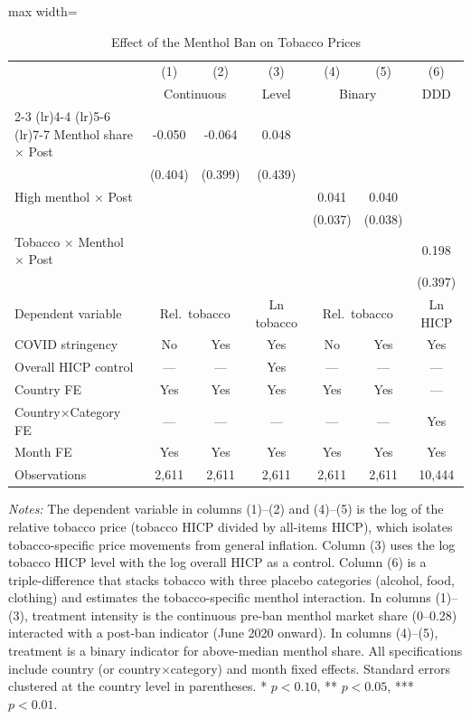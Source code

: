 \begin{table}[H]
\centering
\caption{Effect of the Menthol Ban on Tobacco Prices}
\label{tab:main}
\begin{threeparttable}
\begin{adjustbox}{max width=\textwidth}
\begin{tabular}{lcccccc}
\toprule
 & (1) & (2) & (3) & (4) & (5) & (6) \\
 & \multicolumn{2}{c}{Continuous} & Level & \multicolumn{2}{c}{Binary} & DDD \\
\cmidrule(lr){2-3} \cmidrule(lr){4-4} \cmidrule(lr){5-6} \cmidrule(lr){7-7}
\midrule
Menthol share $\times$ Post & -0.050 & -0.064 & 0.048 & & & \\
 & (0.404) & (0.399) & (0.439) & & & \\
[4pt]
High menthol $\times$ Post & & & & 0.041 & 0.040 & \\
 & & & & (0.037) & (0.038) & \\
[4pt]
Tobacco $\times$ Menthol $\times$ Post & & & & & & 0.198 \\
 & & & & & & (0.397) \\
[4pt]
\midrule
Dependent variable & \multicolumn{2}{c}{Rel.\ tobacco} & Ln tobacco & \multicolumn{2}{c}{Rel.\ tobacco} & Ln HICP \\
COVID stringency & No & Yes & Yes & No & Yes & Yes \\
Overall HICP control & --- & --- & Yes & --- & --- & --- \\
Country FE & Yes & Yes & Yes & Yes & Yes & --- \\
Country$\times$Category FE & --- & --- & --- & --- & --- & Yes \\
Month FE & Yes & Yes & Yes & Yes & Yes & Yes \\
Observations & 2,611 & 2,611 & 2,611 & 2,611 & 2,611 & 10,444 \\
\bottomrule
\end{tabular}
\end{adjustbox}
\begin{tablenotes}[flushleft]
\footnotesize \sloppy
\item \textit{Notes:} The dependent variable in columns (1)--(2) and (4)--(5) is the log of the relative tobacco price (tobacco HICP divided by all-items HICP), which isolates tobacco-specific price movements from general inflation. Column (3) uses the log tobacco HICP level with the log overall HICP as a control. Column (6) is a triple-difference that stacks tobacco with three placebo categories (alcohol, food, clothing) and estimates the tobacco-specific menthol interaction. In columns (1)--(3), treatment intensity is the continuous pre-ban menthol market share (0--0.28) interacted with a post-ban indicator (June 2020 onward). In columns (4)--(5), treatment is a binary indicator for above-median menthol share. All specifications include country (or country$\times$category) and month fixed effects. Standard errors clustered at the country level in parentheses. * $p<0.10$, ** $p<0.05$, *** $p<0.01$.
\end{tablenotes}
\end{threeparttable}
\end{table}
